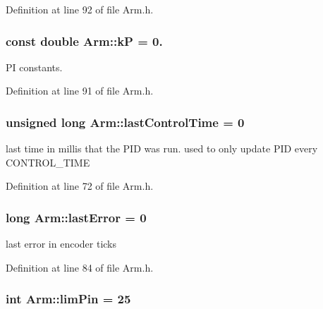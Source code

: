 Definition at line 92 of file Arm.\-h.

\hypertarget{classArm_ac6d95b0c5f8a7700b3d25a9fcead2291}{
\subsubsection[{k\-P}]{\setlength{\rightskip}{0pt plus 5cm}const double Arm\-::k\-P = 0.\hspace{0.3cm}{\ttfamily [private]}}}\label{classArm_ac6d95b0c5f8a7700b3d25a9fcead2291}


P\-I constants. 



Definition at line 91 of file Arm.\-h.

\hypertarget{classArm_a99d553dd144c5fd2bf8b4c68a66fea1b}{
\subsubsection[{last\-Control\-Time}]{\setlength{\rightskip}{0pt plus 5cm}unsigned long Arm\-::last\-Control\-Time = 0\hspace{0.3cm}{\ttfamily [private]}}}\label{classArm_a99d553dd144c5fd2bf8b4c68a66fea1b}


last time in millis that the P\-I\-D was run. used to only update P\-I\-D every C\-O\-N\-T\-R\-O\-L\-\_\-\-T\-I\-M\-E 



Definition at line 72 of file Arm.\-h.

\hypertarget{classArm_a5061b95381cc72d417f5a5275b871e47}{
\subsubsection[{last\-Error}]{\setlength{\rightskip}{0pt plus 5cm}long Arm\-::last\-Error = 0\hspace{0.3cm}{\ttfamily [private]}}}\label{classArm_a5061b95381cc72d417f5a5275b871e47}


last error in encoder ticks 



Definition at line 84 of file Arm.\-h.

\hypertarget{classArm_aade413d7d638bff08bcc0c9ac50818e1}{
\subsubsection[{lim\-Pin}]{\setlength{\rightskip}{0pt plus 5cm}int Arm\-::lim\-Pin = 25\hspace{0.3cm}{\ttfamily [private]}}}\label{classArm_aade413d7d638bff08bcc0c9ac50818e1}


